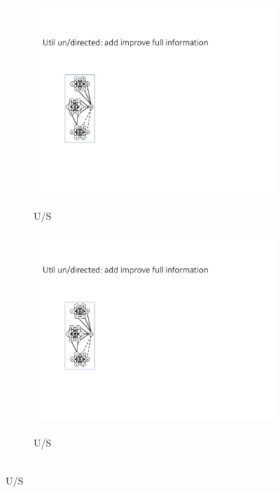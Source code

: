 \documentclass{article}
\begin{document}
\begin{figure}[t]
    \centering
    \centering  
        \begin{subfigure}{0.1\textwidth}
            \centering
            \includegraphics[page=1,width=\textwidth]{Graphs/graphs.pdf}
            \caption{\\U/S}
            \label{fig:Util_remove_Improve}
        \end{subfigure}    
        \hfill
        \begin{subfigure}{0.1\textwidth}
            \centering
            \includegraphics[page=47,width=\textwidth]{Graphs/graphs.pdf}
            \caption{\\U/S}

\end{subfigure}
\end{figure}
\end{document}
